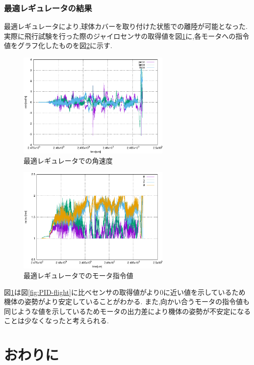 \documentclass[12pt,oneside]{sotsuken_paper}
\begin{document}
\subsection{最適レギュレータの結果}
最適レギュレータにより,球体カバーを取り付けた状態での離陸が可能となった.
実際に飛行試験を行った際のジャイロセンサの取得値を図\ref{fig:rate}に,各モータへの指令値をグラフ化したものを図\ref{fig:RLFB}に示す.

\begin{figure}[htbp]
	\begin{center}
		\includegraphics[width=75mm]{image/flight-test/regulator-rate.eps}
		\caption{最適レギュレータでの角速度}
		\label{fig:rate}
	\end{center}
\end{figure}

\begin{figure}[htbp]
	\begin{center}
		\includegraphics[width=75mm]{image/flight-test/regulator-RLFB.eps}
		\caption{最適レギュレータでのモータ指令値}
		\label{fig:RLFB}
	\end{center}
\end{figure}

図\ref{fig:rate}は図\ref{fig:PID-flight}に比べセンサの取得値がより0に近い値を示しているため機体の姿勢がより安定していることがわかる.
また,向かい合うモータの指令値も同じような値を示しているためモータの出力差により機体の姿勢が不安定になることは少なくなったと考えられる.


\chapter{おわりに}
\end{document}
